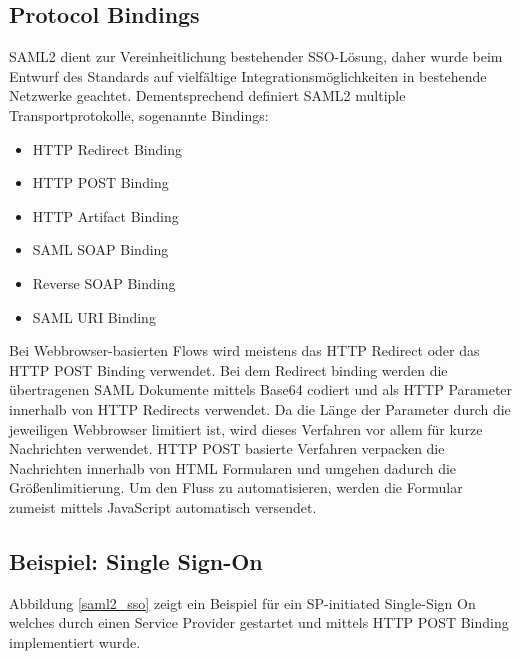 \subsection{Protocol Bindings}

SAML2 dient zur Vereinheitlichung bestehender SSO-Lösung, daher wurde beim Entwurf des Standards auf vielfältige Integrationsmöglichkeiten in bestehende Netzwerke geachtet. Dementsprechend definiert SAML2 multiple Transportprotokolle, sogenannte Bindings:

\begin{itemize}
	\item HTTP Redirect Binding
	\item HTTP POST Binding
	\item HTTP Artifact Binding
	\item SAML SOAP Binding
	\item Reverse SOAP Binding
	\item SAML URI Binding
\end{itemize}

Bei Webbrowser-basierten Flows wird meistens das HTTP Redirect oder das HTTP POST Binding verwendet. Bei dem Redirect binding werden die übertragenen SAML Dokumente mittels Base64 codiert und als HTTP Parameter innerhalb von HTTP Redirects verwendet. Da die Länge der Parameter durch die jeweiligen Webbrowser limitiert ist, wird dieses Verfahren vor allem für kurze Nachrichten verwendet. HTTP POST basierte Verfahren verpacken die Nachrichten innerhalb von HTML Formularen und umgehen dadurch die Größenlimitierung. Um den Fluss zu automatisieren, werden die Formular zumeist mittels JavaScript automatisch versendet.

\subsection{Beispiel: Single Sign-On}

Abbildung \ref{saml2_sso} zeigt ein Beispiel für ein SP-initiated Single-Sign On welches durch einen Service Provider gestartet und mittels HTTP POST Binding implementiert wurde. 

